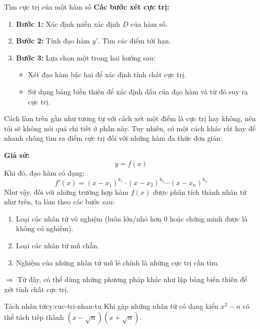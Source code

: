 \begin{lythuyetbox}{Tìm cực trị của một hàm số}
\textbf{Các bước xét cực trị:}
\begin{enumerate}
    \item \textbf{Bước 1:} Xác định miền xác định $D$ của hàm số.
    \item \textbf{Bước 2:} Tính đạo hàm $y'$. Tìm các điểm tới hạn.
    \item \textbf{Bước 3:} Lựa chọn một trong hai hướng sau:
    \begin{itemize}
        \item Xét đạo hàm bậc hai để xác định tính chất cực trị.
        \item Sử dụng bảng biến thiên để xác định dấu của đạo hàm và từ đó suy ra cực trị.
    \end{itemize}

\end{enumerate}

Cách làm trên gần như tương tự với cách xét một điểm là cực trị hay không, nên tôi sẽ không nói quá chi tiết ở phần này. Tuy nhiên, có một cách khác rất hay để nhanh chóng tìm ra điểm cực trị đối với những hàm đa thức đơn giản:

\textbf{Giả sử:}
\[
    y = f(x)
\]
Khi đó, đạo hàm có dạng:
\[
    f'(x) = (x - x_1)^{k_1} \cdot (x - x_2)^{k_2} \cdots (x - x_n)^{k_n}
\]
Như vậy, đối với những trường hợp hàm $f(x)$ được phân tích thành nhân tử như trên, ta làm theo các bước sau:
\begin{enumerate}
    \item Loại các nhân tử vô nghiệm (luôn lớn/nhỏ hơn 0 hoặc chứng minh được là không có nghiệm).
    \item Loại các nhân tử mũ chẵn.
    \item Nghiệm của những nhân tử mũ lẻ chính là những cực trị cần tìm. 
\end{enumerate}

\vspace{0.5em}
\noindent
$\Rightarrow$ Từ đây, có thể dùng những phương pháp khác như lập bảng biến thiên để xét tính chất cực trị.

\begin{chuy}{Tách nhân tử}{cy:cuc-tri-nhan-tu}
  Khi gặp những nhân tử có dạng kiểu $x^2 - n$ có thể tách tiếp thành $(x - \sqrt{n})(x + \sqrt{n})$.
\end{chuy}


\end{lythuyetbox}
